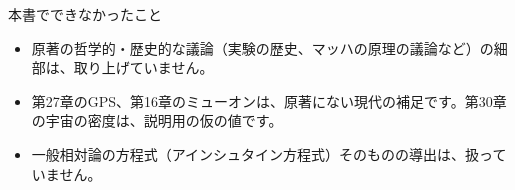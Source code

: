 \documentclass[a4paper,11pt,openany]{ltjsbook}
\begin{document}
\begin{notebox}{本書でできなかったこと}
\begin{itemize}[leftmargin=*]
\item 原著の哲学的・歴史的な議論（実験の歴史、マッハの原理の議論など）の細部は、取り上げていません。
\item 第27章のGPS、第16章のミューオンは、原著にない現代の補足です。第30章の宇宙の密度は、説明用の仮の値です。
\item 一般相対論の方程式（アインシュタイン方程式）そのものの導出は、扱っていません。
\end{itemize}
\end{notebox}
\end{document}
